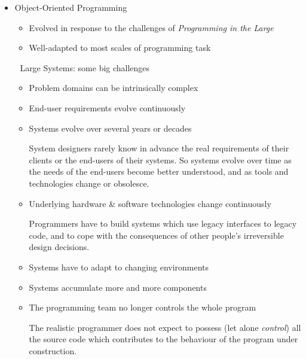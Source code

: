 \documentclass{ip3}
\begin{document}
\begin{foil}
\begin{itemize}
        \item Object-Oriented Programming 
        \begin{itemize}
              \item Evolved in response to the challenges of \textit{Programming in the Large}
              \item Well-adapted to most scales of programming task
        \end{itemize}
        
        \vitem Large Systems: some big challenges
        \begin{itemize}
                \item Problem domains can be intrinsically complex 
                \item End-user requirements evolve continuously
                \item Systems evolve over several years or decades
                \begin{note}
                      System designers rarely know in advance the
                      real requirements of their clients or the
                      end-users of their systems.
                      So systems evolve over time as the needs
                      of the end-users become better understood, and
                      as tools and technologies change or obsolesce.
                \end{note}
                \item Underlying hardware \& software technologies change continuously
                      \begin{note}
                      Programmers have to build systems which use
                      legacy interfaces to legacy code, and to
                      cope with the consequences of other people's
                      irreversible design decisions.
                      \end{note}
                \item Systems have to adapt to changing environments
                \item Systems accumulate more and more components
                \item The programming team no longer controls the whole program
                \begin{note}
                      The realistic programmer does not expect to
                      possess (let alone \textit{control}) all the source
                      code which contributes to the behaviour of
                      the program under construction.


\end{note}
\end{itemize}
\end{itemize}
\end{foil}
\end{document}

